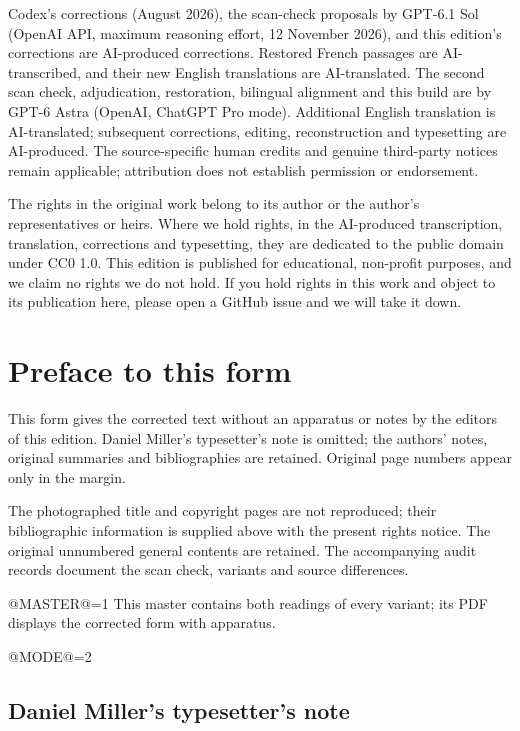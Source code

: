 \documentclass[oneside]{book}
\makeatletter
\theoremstyle{sga-source}
\theoremstyle{sga-source-dash}
\theoremstyle{sga-source-dotdash}
\theoremstyle{sga-source-number-note-dash}
\theoremstyle{sga-source-note-number-dotdash}
\theoremstyle{sga-source-example-dotdash}
\theoremstyle{sga-source-inline-number}
\theoremstyle{sga-source-bare-number}
\theoremstyle{sga-source}
\providecommand\EditionMode{@MODE@}
\providecommand\EditionIsMaster{@MASTER@}
\makeatother
\begin{document}
\medskip
Codex’s corrections (August 2026), the scan-check proposals by GPT-6.1 Sol
(OpenAI API, maximum reasoning effort, 12 November 2026), and this edition’s
corrections are AI-produced corrections. Restored French passages are
AI-transcribed, and their new English translations are AI-translated.
The second scan check, adjudication, restoration, bilingual alignment and
this build are by GPT-6 Astra (OpenAI, ChatGPT Pro mode).
Additional English translation is AI-translated; subsequent corrections,
editing, reconstruction and typesetting are AI-produced. The
source-specific human credits and genuine third-party notices remain
applicable; attribution does not establish permission or endorsement.

\medskip
The rights in the original work belong to its author or the author's representatives or heirs.
Where we hold rights, in the AI-produced transcription, translation, corrections and typesetting, they are
dedicated to the public domain under CC0 1.0. This edition is published for educational, non-profit purposes,
and we claim no rights we do not hold. If you hold rights in this work and object to its publication here,
please open a GitHub issue and we will take it down.

\chapter*{Preface to this form}
This form gives the corrected text without an apparatus or notes
by the editors of this edition. Daniel Miller’s typesetter’s note is
omitted; the authors’ notes, original summaries and bibliographies are
retained. Original page numbers appear only in the margin.

The photographed title and copyright pages are not reproduced; their
bibliographic information is supplied above with the present rights
notice. The original unnumbered general contents are retained. The
accompanying audit records document the scan check, variants and source
differences.

\ifnum\EditionIsMaster=1\relax
This master contains both readings of every variant; its PDF displays the corrected form with apparatus.
\fi

\clearpage

\fi
\ifnum\EditionMode=2\relax\else

\section*{Daniel Miller’s typesetter’s note}
\end{document}
